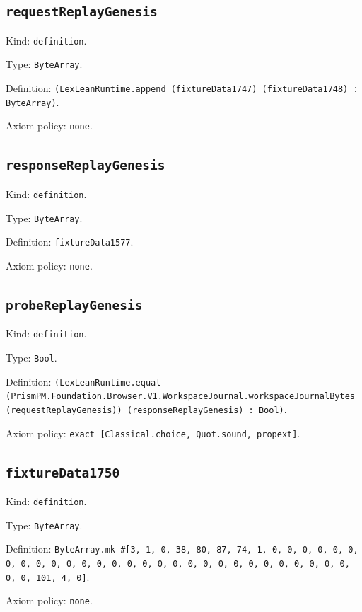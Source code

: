 \documentclass[11pt]{article}
\begin{document}
\subsection*{\texttt{requestReplayGenesis}}
\noindent Kind: \texttt{definition}.\par
\noindent Type: \texttt{ByteArray}.\par
\noindent Definition: \texttt{(LexLeanRuntime.append (fixtureData1747) (fixtureData1748) : ByteArray)}.\par
\noindent Axiom policy: \texttt{none}.\par
\subsection*{\texttt{responseReplayGenesis}}
\noindent Kind: \texttt{definition}.\par
\noindent Type: \texttt{ByteArray}.\par
\noindent Definition: \texttt{fixtureData1577}.\par
\noindent Axiom policy: \texttt{none}.\par
\subsection*{\texttt{probeReplayGenesis}}
\noindent Kind: \texttt{definition}.\par
\noindent Type: \texttt{Bool}.\par
\noindent Definition: \texttt{(LexLeanRuntime.equal (PrismPM.Foundation.Browser.V1.WorkspaceJournal.workspaceJournalBytes (requestReplayGenesis)) (responseReplayGenesis) : Bool)}.\par
\noindent Axiom policy: \texttt{exact [Classical.choice, Quot.sound, propext]}.\par
\subsection*{\texttt{fixtureData1750}}
\noindent Kind: \texttt{definition}.\par
\noindent Type: \texttt{ByteArray}.\par
\noindent Definition: \texttt{ByteArray.mk \#[3, 1, 0, 38, 80, 87, 74, 1, 0, 0, 0, 0, 0, 0, 0, 0, 0, 0, 0, 0, 0, 0, 0, 0, 0, 0, 0, 0, 0, 0, 0, 0, 0, 0, 0, 0, 0, 0, 0, 101, 4, 0]}.\par
\noindent Axiom policy: \texttt{none}.\par
\end{document}
